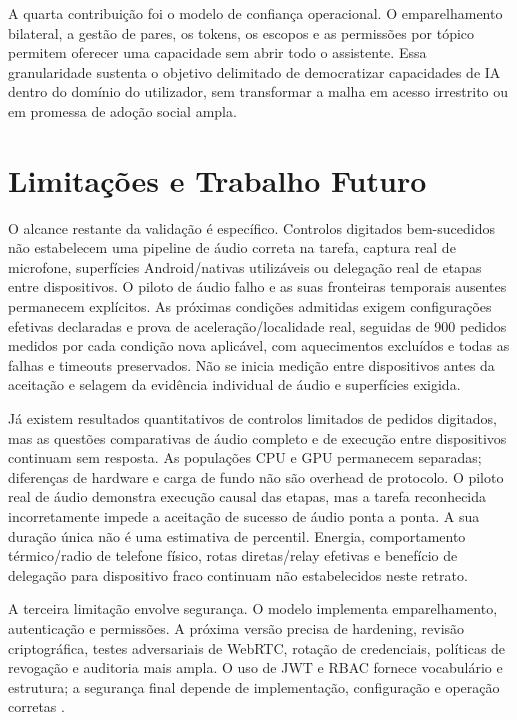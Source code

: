 A quarta contribui\c{c}\~{a}o foi o modelo de confian\c{c}a operacional. O emparelhamento bilateral, a gest\~{a}o de pares, os tokens, os escopos e as permiss\~{o}es por t\'{o}pico permitem oferecer uma capacidade sem abrir todo o assistente. Essa granularidade sustenta o objetivo delimitado de democratizar capacidades de IA dentro do dom\'{i}nio do utilizador, sem transformar a malha em acesso irrestrito ou em promessa de ado\c{c}\~{a}o social ampla.

\section{Limita\c{c}\~{o}es e Trabalho Futuro}
\label{sec:limitacoes-futuro}

O alcance restante da validação é específico. Controlos digitados bem-sucedidos não estabelecem uma pipeline de áudio correta na tarefa, captura real de microfone, superfícies Android/nativas utilizáveis ou delegação real de etapas entre dispositivos. O piloto de áudio falho e as suas fronteiras temporais ausentes permanecem explícitos. As próximas condições admitidas exigem configurações efetivas declaradas e prova de aceleração/localidade real, seguidas de 900 pedidos medidos por cada condição nova aplicável, com aquecimentos excluídos e todas as falhas e timeouts preservados. Não se inicia medição entre dispositivos antes da aceitação e selagem da evidência individual de áudio e superfícies exigida.

Já existem resultados quantitativos de controlos limitados de pedidos digitados, mas as questões comparativas de áudio completo e de execução entre dispositivos continuam sem resposta. As populações CPU e GPU permanecem separadas; diferenças de hardware e carga de fundo não são overhead de protocolo. O piloto real de áudio demonstra execução causal das etapas, mas a tarefa reconhecida incorretamente impede a aceitação de sucesso de áudio ponta a ponta. A sua duração única não é uma estimativa de percentil. Energia, comportamento térmico/radio de telefone físico, rotas diretas/relay efetivas e benefício de delegação para dispositivo fraco continuam não estabelecidos neste retrato.

A terceira limita\c{c}\~{a}o envolve seguran\c{c}a. O modelo implementa emparelhamento, autentica\c{c}\~{a}o e permiss\~{o}es. A pr\'{o}xima vers\~{a}o precisa de hardening, revis\~{a}o criptogr\'{a}fica, testes adversariais de WebRTC, rota\c{c}\~{a}o de credenciais, pol\'{i}ticas de revoga\c{c}\~{a}o e auditoria mais ampla. O uso de JWT e RBAC fornece vocabul\'{a}rio e estrutura; a seguran\c{c}a final depende de implementa\c{c}\~{a}o, configura\c{c}\~{a}o e opera\c{c}\~{a}o corretas \cite{rfc7519_jwt,rfc8725_jwt_bcp}.

